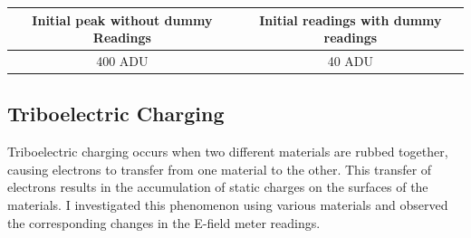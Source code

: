 \documentclass[a4paper,11pt]{article}%
\begin{document}
\begin{itemize}
        \begin{table}[H]
          \centering
          \begin{tabular}{|c|c|}
            \hline
            Initial peak without dummy Readings & Initial readings with dummy readings \\
            \hline
            400 ADU                             & 40 ADU                               \\
            \hline
          \end{tabular}
        \end{table}

\end{itemize}
\subsection{Triboelectric Charging}
Triboelectric charging occurs when two different materials are rubbed together, causing electrons to transfer from one material to the other. This transfer of electrons results in the accumulation of static charges on the surfaces of the materials. I investigated this phenomenon using various materials and observed the corresponding changes in the E-field meter readings.
\end{document}
